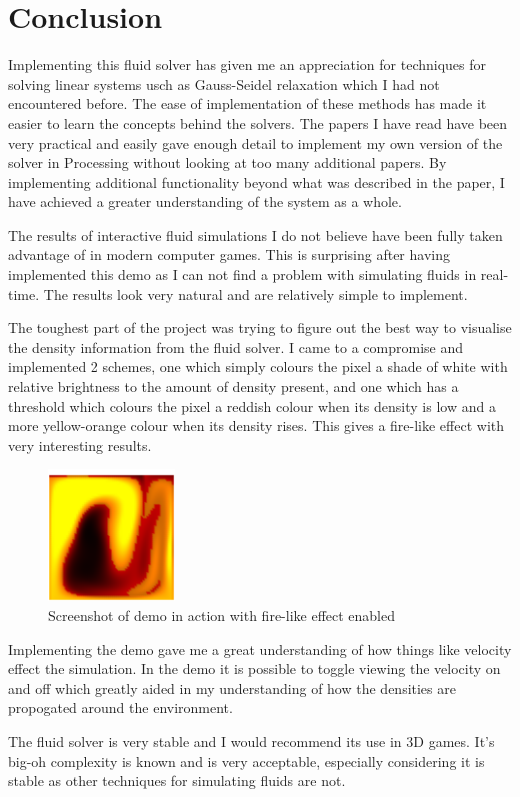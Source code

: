 \section{Conclusion}
Implementing this fluid solver has given me an appreciation for techniques for solving linear systems usch as Gauss-Seidel relaxation which I had not encountered before. 
The ease of implementation of these methods has made it easier to learn the concepts behind the solvers.
The papers I have read have been very practical and easily gave enough detail to implement my own version of the solver in Processing without looking at too many additional papers.
By implementing additional functionality beyond what was described in the paper, I have achieved a greater understanding of the system as a whole.

The results of interactive fluid simulations I do not believe have been fully taken advantage of in modern computer games.
This is surprising after having implemented this demo as I can not find a problem with simulating fluids in real-time.
The results look very natural and are relatively simple to implement.

The toughest part of the project was trying to figure out the best way to visualise the density information from the fluid solver. 
I came to a compromise and implemented 2 schemes, one which simply colours the pixel a shade of white with relative brightness to the amount of density present, and one which has a threshold which colours the pixel a reddish colour when its density is low and a more yellow-orange colour when its density rises. 
This gives a fire-like effect with very interesting results.
\begin{figure}
  \caption{Screenshot of demo in action with fire-like effect enabled}
  \centering
    \includegraphics[width=0.3\textwidth]{images/demo}
\end{figure}

Implementing the demo gave me a great understanding of how things like velocity effect the simulation.
In the demo it is possible to toggle viewing the velocity on and off which greatly aided in my understanding of how the densities are propogated around the environment.

The fluid solver is very stable and I would recommend its use in 3D games.
It's big-oh complexity is known and is very acceptable, especially considering it is stable as other techniques for simulating fluids are not.
